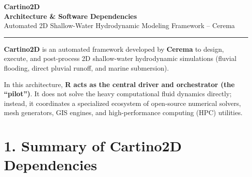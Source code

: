 \documentclass[10pt,a4paper]{article}
\begin{document}
\begin{center}
  {\Huge\bfseries\color{navyblue} Cartino2D}\\[0.3em]
  {\Large\bfseries\color{ceremateal} Architecture \& Software Dependencies}\\[0.5em]
  {\small\color{optionalgray} Automated 2D Shallow-Water Hydrodynamic Modeling Framework – Cerema}\\[0.4em]
  \rule{\textwidth}{1.2pt}
\end{center}

\vspace{0.4em}

\begin{tcolorbox}[orchestratorbox]
\textbf{Cartino2D} is an automated framework developed by \textbf{Cerema} to design, execute, and post-process 2D shallow-water hydrodynamic simulations (fluvial flooding, direct pluvial runoff, and marine submersion).

In this architecture, \textbf{R acts as the central driver and orchestrator (the ``pilot'')}. It does not solve the heavy computational fluid dynamics directly; instead, it coordinates a specialized ecosystem of open-source numerical solvers, mesh generators, GIS engines, and high-performance computing (HPC) utilities.
\end{tcolorbox}

\vspace{0.6em}

\section*{1. Summary of Cartino2D Dependencies}
\end{document}
